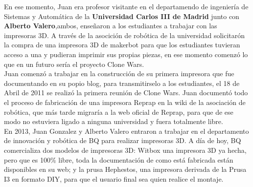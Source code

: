 En ese momento, Juan era profesor visitante en el departamendo de ingeniería de Sistemas y Automática de la \textbf{Universidad Carlos III de Madrid} junto con \textbf{Alberto Valero},ambos, enseñaron a los estudiantes a trabajar con las impresoras 3D. A través de la asocición de robótica de la universidad solicitarón la compra de una impresora 3D de makerbot para que los estudiantes tuvieran acceso a una y pudieran imprimir sus propias piezas, en ese momento comenzó lo que en un futuro sería el proyecto Clone Wars.\\

Juan comenzó a trabajar en la construcción de su primera impresora que fue documentando en su popio blog, para transmitirselo a los estudiantes, el 18 de Abril de 2011 se realizó la primera reunión de Clone Wars. Juan documentó todo el proceso de fabricación de una impresora Reprap en la wiki de la asociación de robótica, que más tarde migraría a la web oficial de Reprap, para que de ese modo no estuviera ligado a ninguna universidad y fuera totalmente libre.\\

En 2013, Juan Gonzalez y Alberto Valero entraron a trabajar en el departamento de innovación y robótica de BQ para realizar impresoras 3D. A día de hoy, BQ comercializa dos modelos de impresoras 3D: Witbox una impresora 3D ya hecha, pero que es 100\% libre, toda la documentación de como está fabricada están disponibles en su web; y  la prusa Hephestos, una impresora derivada de la Prusa I3 en formato DIY, para que el usuario final sea quien realice el montaje.\\

